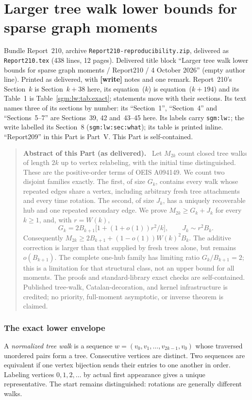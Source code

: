 \documentclass[11pt,letterpaper]{article}
\theoremstyle{remark}\newtheorem{remark}[theorem]{Remark}
\newcommand{\file}[1]{\nolinkurl{#1}}
\newenvironment{partabstract}{\begin{quote}\small\noindent\textbf{Abstract of this Part (as delivered).}\ }{\end{quote}}
\newcommand{\partsource}[1]{\par\noindent\begin{minipage}{\textwidth}\small #1\end{minipage}\par\medskip}
\theoremstyle{definition}\newtheorem{definition}[theorem]{Definition}
\begin{document}
\part{Larger tree walk lower bounds for sparse graph moments}\label{sgm:lw:part}
\setcounter{section}{38}
\partsource{Bundle Report~210, archive \file{Report210-reproducibility.zip}, delivered as \file{Report210.tex} (438 lines, 12 pages). Delivered title block ``Larger tree walk lower bounds for sparse graph moments / Report210 / 4 October 2026'' (empty author line). Printed as delivered, with \textbf{[write]} notes and one remark. Report~210's Section~$k$ is Section~$k+38$ here, its equation~($k$) is equation~($k+194$) and its Table~1 is Table~\ref{sgm:lw:tab:exact}; statements move with their sections. Its text names three of its sections by number: its ``Section~1'', ``Section~4'' and ``Sections~5--7'' are Sections~39, 42 and~43--45 here. Its labels carry \file{sgm:lw:}; the write labelled its Section~8 (\file{sgm:lw:sec:what}); its table is printed inline. ``Report209'' in this Part is Part~V. This Part is self-contained.}
\begin{partabstract}
Let $M_{2k}$ count closed tree walks of length $2k$ up to vertex relabeling, with the initial time distinguished. These are the positive-order terms of OEIS A094149. We count two disjoint families exactly. The first, of size $G_k$, contains every walk whose repeated edges share a vertex, including arbitrary fresh tree attachments and every time rotation. The second, of size $J_k$, has a uniquely recoverable hub and one repeated secondary edge. We prove $M_{2k}\ge G_k+J_k$ for every $k\ge1$, and, with $r=W(k)$,
\[
 G_k=2B_{k+1}\bigl[1+(1+o(1))r^2/k\bigr],\qquad
 J_k\sim r^2B_k.
\]
Consequently $M_{2k}\ge2B_{k+1}+(1-o(1))W(k)^2B_k$. The additive correction is larger than that supplied by fresh trees alone, but remains $o(B_{k+1})$. The complete one-hub family has limiting ratio $G_k/B_{k+1}=2$; this is a limitation for that structural class, not an upper bound for all moments. The proofs and standard-library exact checks are self-contained. Published tree-walk, Catalan-decoration, and kernel infrastructure is credited; no priority, full-moment asymptotic, or inverse theorem is claimed.
\end{partabstract}

\section{The exact lower envelope}
A \emph{normalized tree walk} is a sequence
$w=(v_0,v_1,\ldots,v_{2k-1},v_0)$ whose traversed unordered pairs form a tree. Consecutive vertices are distinct. Two sequences are equivalent if one vertex bijection sends their entries to one another in order. Labeling vertices $0,1,2,\ldots$ by actual first appearance gives a unique representative. The start remains distinguished: rotations are generally different walks.
\end{document}
